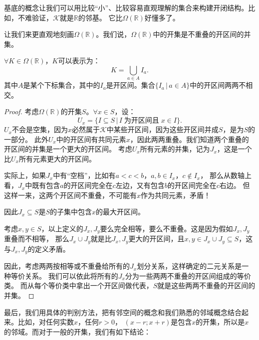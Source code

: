 \documentclass[12pt,UTF8,fontset=none]{ctexbook}
\begin{document}
\begin{appendix}
基底的概念让我们可以用比较“小”、比较容易直观理解的集合来构建开闭结构。比如，不难验证，$\mathcal{K}$就是$\mathbb{R}$的邻基。
它比$\Omega(\mathbb{R})$好懂多了。


让我们来更直观地刻画$\Omega(\mathbb{R})$。我们说，$\Omega(\mathbb{R})$中的开集是不重叠的开区间的并集。
\begin{tm}\label{tm:a-1-20}
    $\forall K \in \Omega(\mathbb{R})$，$K$可以表示为：
    $$ K = \bigcup_{a\in A} I_a. $$
    其中$A$是某个下标集合，其中的$I_a$是开区间。集合$\{I_a \, | \, a\in A\}$中的开区间两两不相交。
\end{tm}

\begin{proof}
    考虑$\Omega(\mathbb{R})$的开集$S$。$\forall x\in S$，设：
    $$ U_x = \{I\subseteq S \, | \, I\;\mbox{为开区间且}\;x\in I \}.$$
    $U_x$不会是空集，因为$x$必然属于$\mathcal{K}$中某些开区间，因为这些开区间并成$S$，是为$S$的一部分。
    此外$U_x$中的开区间有共同元素$x$，因此两两重叠。我们知道两个重叠的开区间的并集是一个更大的开区间。
    考虑$U_x$所有元素的并集，记为$J_x$，这是一个比$U_x$所有元素更大的开区间。
    
    实际上，如果$J_x$中有“空档”，比如有$a<c<b$，$a, b\in I_x$，$c\notin I_x$，
    那么从数轴上看，$J_x$中既有包含$a$的开区间完全在$c$左边，又有包含$b$的开区间完全在$c$右边。
    但这样一来，这两个开区间不重叠，不可能有$x$作为共同元素，矛盾！
    
    因此$J_x\subseteq S$是$S$的子集中包含$x$的最大开区间。

    考虑$x,y\in S$，以上定义的$J_x, J_y$要么完全相等，要么不重叠。这是因为假如$J_x, J_y$重叠而不相等，
    那么$J_x\cup J_y$就是比$J_x, J_y$更大的开区间，且$x,y\in J_x\cup J_y\subseteq S$，这与$J_x, J_y$的定义矛盾。

    因此，考虑两两按相等或不重叠给所有的$J_x$划分关系，这样确定的二元关系是一种等价关系。
    我们可以依此将所有的$J_x$分为一些两两不重叠的开区间组成的等价类。
    而从每个等价类中拿出一个开区间做代表，$S$就是这些两两不重叠的开区间的并集。

\end{proof}

最后，我们用具体的判别方法，把有邻空间的概念和我们熟悉的邻域概念结合起来。比如，对任何实数$x$，任何$r>0$，
$(x-r;x+r)$是包含$x$的开集，所以是$x$的邻域。而对于一般的开集，我们有如下结论：


\end{appendix}
\end{document}
